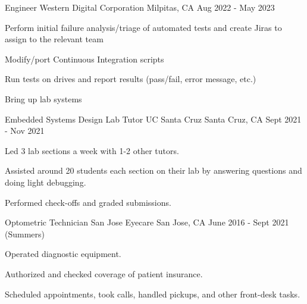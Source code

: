 
\begin{cventries}
  \cventry
    {Engineer} %
    {Western Digital Corporation} %
    {Milpitas, CA} %
    {Aug 2022 - May 2023} %
    {
      \begin{cvitems} %
        \item {Perform initial failure analysis/triage of automated tests and create Jiras to assign to the relevant team}
        \item {Modify/port Continuous Integration scripts}
        \item {Run tests on drives and report results (pass/fail, error message, etc.)}
        \item {Bring up lab systems}
      \end{cvitems}
    }

  \cventry
    {Embedded Systems Design Lab Tutor} %
    {UC Santa Cruz} %
    {Santa Cruz, CA} %
    {Sept 2021 - Nov 2021} %
    {
      \begin{cvitems} %
        \item {Led 3 lab sections a week with 1-2 other tutors.}
        \item {Assisted around 20 students each section on their lab by answering questions and doing light debugging.}
        \item {Performed check-offs and graded submissions.}
      \end{cvitems}
    }

  \cventry
    {Optometric Technician} %
    {San Jose Eyecare} %
    {San Jose, CA} %
    {June 2016 - Sept 2021 (Summers)} %
    {
      \begin{cvitems} %
        \item {Operated diagnostic equipment.}
        \item {Authorized and checked coverage of patient insurance.}
        \item {Scheduled appointments, took calls, handled pickups, and other front-desk tasks.}
      \end{cvitems}
    }
\end{cventries}
